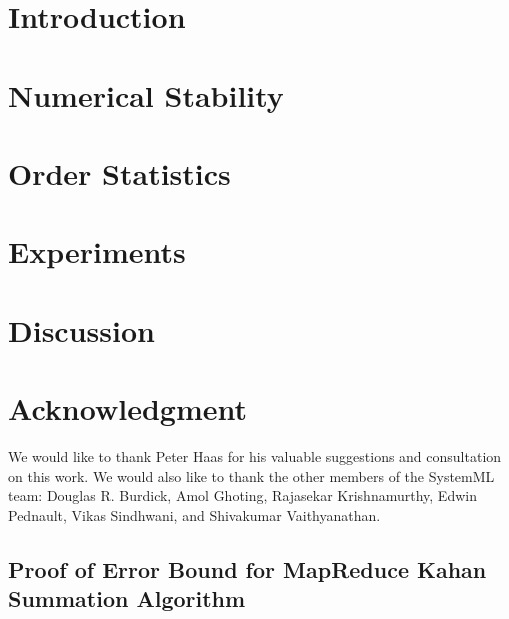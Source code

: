 \documentclass[10pt,conference,letterpaper]{IEEEtran}
\begin{document}
\section{Introduction}


\section{Numerical Stability}
\label{sec:stability}


\section{Order Statistics}\label{sec:sort-order-stats}





\section{Experiments}
\label{sec:exp}


\section{Discussion}


\section*{Acknowledgment}
We would like to thank Peter Haas for his valuable suggestions and consultation on this work. We would also like to thank the other members of the SystemML team: Douglas R. Burdick, Amol Ghoting, Rajasekar Krishnamurthy, Edwin Pednault, Vikas Sindhwani, and Shivakumar Vaithyanathan.




\newpage

\begin{appendices}
\section{Proof of Error Bound for MapReduce Kahan Summation Algorithm}

\end{appendices}
\end{document}

